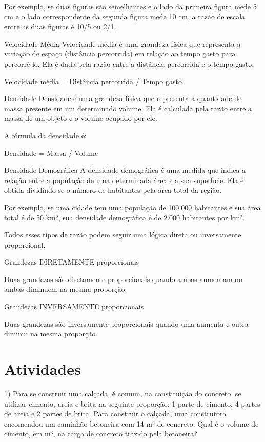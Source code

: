Por exemplo, se duas figuras são semelhantes e o lado da primeira figura
mede 5 cm e o lado correspondente da segunda figura mede 10 cm, a razão
de escala entre as duas figuras é 10/5 ou 2/1.

Velocidade Média Velocidade média é uma grandeza física que representa a
variação de espaço (distância percorrida) em relação ao tempo gasto para
percorrê-lo. Ela é dada pela razão entre a distância percorrida e o
tempo gasto:

Velocidade média = Distância percorrida / Tempo gasto

Densidade Densidade é uma grandeza física que representa a quantidade de
massa presente em um determinado volume. Ela é calculada pela razão
entre a massa de um objeto e o volume ocupado por ele.

A fórmula da densidade é:

Densidade = Massa / Volume

Densidade Demográfica A densidade demográfica é uma medida que indica a
relação entre a população de uma determinada área e a sua superfície.
Ela é obtida dividindo-se o número de habitantes pela área total da
região.

Por exemplo, se uma cidade tem uma população de 100.000 habitantes e sua
área total é de 50 km², sua densidade demográfica é de 2.000 habitantes
por km².

Todos esses tipos de razão podem seguir uma lógica direta ou
inversamente proporcional.

Grandezas DIRETAMENTE proporcionais

Duas grandezas são diretamente proporcionais quando ambas aumentam ou
ambas diminuem na mesma proporção.

Grandezas INVERSAMENTE proporcionais

Duas grandezas são inversamente proporcionais quando uma aumenta e outra
diminui na mesma proporção.

\section{Atividades}

1) Para se construir uma calçada, é comum, na constituição do concreto,
se utilizar cimento, areia e brita na seguinte proporção: 1 parte de
cimento, 4 partes de areia e 2 partes de brita. Para construir o
calçada, uma construtora encomendou um caminhão betoneira com 14 m³ de
concreto. Qual é o volume de cimento, em m³, na carga de concreto
trazido pela betoneira?

